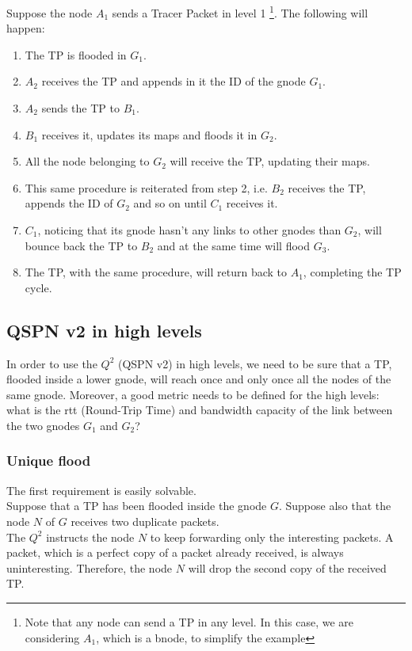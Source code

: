 \documentclass[a4paper]{article}
\begin{document}
Suppose the node $A_1$ sends a Tracer Packet in level 1 
\footnote{Note that any node can send a TP in any level. In this case, we are
considering $A_1$, which is a bnode, to simplify the example}. 
The following will happen:
\begin{enumerate}
	\item The TP is flooded in $G_1$.
	\item $A_2$ receives the TP and appends in it the ID of the gnode
		$G_1$.
	\item $A_2$ sends the TP to $B_1$.
	\item $B_1$ receives it, updates its maps and floods it in $G_2$.
	\item All the node belonging to $G_2$ will receive the TP, updating their
		maps.
	\item This same procedure is reiterated from step 2, i.e. $B_2$ receives
		the TP, appends the ID of $G_2$ and so on until $C_1$ receives
		it.
	\item $C_1$, noticing that its gnode hasn't any links to other gnodes
		than $G_2$, will bounce back the TP to $B_2$ and at the same
		time will flood $G_3$.
	\item The TP, with the same procedure, will return back to $A_1$,
		completing the TP cycle.
\end{enumerate}

\subsection{QSPN v2 in high levels}
In order to use the $Q^2$ (QSPN v2) in high levels, we need to be sure that a TP,
flooded inside a lower gnode, will reach once and only once all the nodes of
the same gnode. Moreover, a good metric needs to be defined for the high
levels: what is the rtt (Round-Trip Time) and bandwidth capacity of the link
between the two gnodes $G_1$ and $G_2$?

\subsubsection{Unique flood}
The first requirement is easily solvable.\\

Suppose that a TP has been flooded inside the gnode $G$.
Suppose also that the node $N$ of $G$ receives two duplicate packets.\\
The $Q^2$ instructs the node $N$ to keep forwarding only the interesting packets.
A packet, which is a perfect copy of a packet already received, is always
uninteresting. Therefore, the node $N$ will drop the second copy of the
received TP.\\
\end{document}
